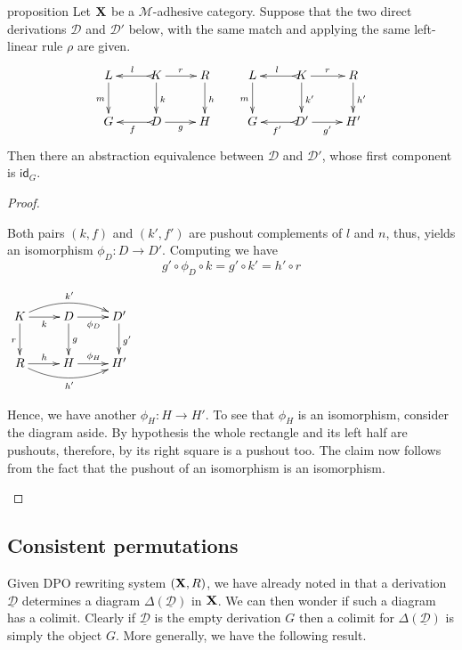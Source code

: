 \documentclass[a4paper,UKenglish,cleveref,pdftex, thm-restate,numberwithinsect]{lipics}
\newcommand{\id}[1]{\mathsf{id}_{#1}}
\def\R{\mathsf{R}}
\def\X{\textbf {\textup{X}}}
\newcommand{\dder}[1]{\mathscr{#1}}
\newcommand{\der}[1]{\underline{\dder{#1}}}
\begin{document}
\begin{theoremEnd}[category=sec2]{proposition}\label{prop:unique} Let $\X$  be a $\mathcal{M}$-adhesive category. Suppose that the two direct derivations $\dder{D}$ and $\dder{D}'$ below, with the same match and applying the same left-linear rule $\rho$ are given.
	\[\xymatrix{L \ar[d]_{m}& K \ar[d]^{k}\ar@{>->}[l]_{l} \ar[r]^{r} & R \ar[d]^{h} & L \ar[d]_{m}& K \ar[d]^{k'}\ar@{>->}[l]_{l} \ar[r]^{r} & R \ar[d]^{h'}\\G & \ar@{>->}[l]^{f} D \ar[r]_{g}& H & G & \ar@{>->}[l]^{f'} D' \ar[r]_{g'}& H'}\]
	Then there an abstraction equivalence between $\dder{D}$ and $\dder{D}'$, whose first component is $\id{G}$.
\end{theoremEnd}
\begin{proof}\begin{proofEnd}
		Both pairs $(k, f)$ and $(k', f')$ are pushout complements of $l$ and $n$, thus,  yields an isomorphism $\phi_D\colon D\to D'$. Computing we have
		\[
		g'\circ \phi_D \circ k= g' \circ k'=h'\circ r\]
		
		\noindent
		\parbox{3cm}{
			$\xymatrix{K  \ar@/^.4cm/[rr]^{k'}\ar[d]_{r} \ar[r]_{k}& \ar[r]_{\phi_D} D \ar[d]^{g}& D' \ar[d]^{g'}\\ R \ar@/_.4cm/[rr]_{h'} \ar[r]^{h}& H \ar[r]^{\phi_H}& H'}$} \hfill 
		\parbox{10cm}{
		\hspace{15pt}Hence, we have another $\phi_H\colon H\to H'$. To see that $\phi_H$ is an isomorphism, consider the diagram aside. By hypothesis the whole rectangle and its left half are pushouts, therefore, by  its right square is a pushout too. The claim now follows from the fact that the pushout of an isomorphism is an isomorphism. \qedhere }
	\end{proofEnd}
\end{proof}

\iffalse 

\subsection{Consistent permutations}

Given DPO rewriting system $(\X, \R)$,  we have already noted in  that a derivation $\der{D}$  determines a diagram $\Delta(\der{D})$ in $\X$. We can then wonder if such a diagram has a colimit. Clearly if $\der{D}$ is the empty derivation $G$ then a colimit for $\Delta(\der{D})$ is simply the object $G$. More generally, we have the following result.
\end{document}

